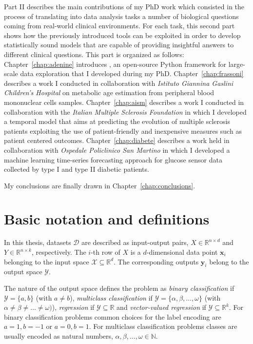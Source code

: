 Part II describes the main contributions of my PhD work which consisted in the process of translating into data analysis tasks a number of biological questions coming from real-world clinical environments. For each task, this second part shows how the previously introduced tools can be exploited in order to develop statistically sound models that are capable of providing insightful answers to different clinical questions.
This part is organized as follows:
Chapter~\ref{chap:adenine} introduces \ade, an open-source Python framework for large-scale data exploration that I developed during my PhD. Chapter~\ref{chap:frassoni} describes a work I conducted in collaboration with \textit{Istituto Giannina Gaslini Children's Hospital} on metabolic age estimation from peripheral blood mononuclear cells samples.
Chapter~\ref{chap:aism} describes a work I conducted in collaboration with the \textit{Italian Multiple Sclerosis Foundation} in which I developed a temporal model that aims at predicting the evolution of multiple sclerosis patients exploiting the use of patient-friendly and inexpensive measures such as patient centered outcomes.
Chapter~\ref{chap:diabete} describes a work held in collaboration with \textit{Ospedale Policlinico San Martino} in which I developed a machine learning time-series forecasting approach for glucose sensor data collected by type I and type II diabetic patients.

My conclusions are finally drawn in Chapter~\ref{chap:conclusions}.

\chapter{Basic notation and definitions} \label{sec:notation}
In this thesis, datasets $\mathcal{D}$ are described as input-output pairs, $X \in \mathbb{R}^{n \times d}$ and $Y \in \mathbb{R}^{n \times k}$, respectively.
The $i$-th row of $X$ is a $d$-dimensional data point $\bm{x}_{i}$ belonging to the input space $\mathcal{X}\subseteq\mathds{R}^d$. The corresponding outputs $\bm{y}_{i}$ belong to the output space $\mathcal{Y}$.

The nature of the output space defines the problem as \textit{binary classification} if  $\mathcal{Y} = \{a,b\}$ (with $a\neq b$), \textit{multiclass classification} if
$\mathcal{Y} = \{\alpha,\beta,\dots,\omega\}$
(with $\alpha \neq \beta \neq \dots \neq \omega)$),
\textit{regression} if $\mathcal{Y}\subseteq\mathds{R}$ and
\textit{vector-valued regression} if $\mathcal{Y}\subseteq\mathds{R}^k$.
For binary classification problems common choices for the label encoding are $a=1, b=-1$ or $a=0, b=1$.
For multiclass classification problems classes are usually encoded as natural numbers, \ie $\alpha, \beta, \dots, \omega \in \mathbb{N}$.

